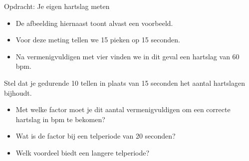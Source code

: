 \begin{opdracht}{Opdracht: Je eigen hartslag meten}
\begin{enumerate}
			\begin{minipage}{.6\linewidth}
			\begin{itemize}
				\item De afbeelding hiernaast toont alvast een voorbeeld. 
				\item Voor deze meting tellen we 15 pieken op 15 seconden. 
				\item Na vermenigvuldigen met vier vinden we in dit geval een hartslag van 60 bpm.
			\end{itemize}
			\end{minipage}	
			\begin{minipage}{.4\linewidth}
			\end{minipage}	
	\end{enumerate}

	
%		


\end{opdracht}

\begin{oef}
	Stel dat je gedurende 10 tellen in plaats van 15 seconden het aantal hartslagen bijhoudt.
	\begin{itemize}
		\item Met welke factor moet je dit aantal vermenigvuldigen om een correcte hartslag in bpm te bekomen? 
	
		\item Wat is de factor bij een telperiode van 20 seconden?
	
		\item Welk voordeel biedt een langere telperiode?
	\end{itemize}
\end{oef}

